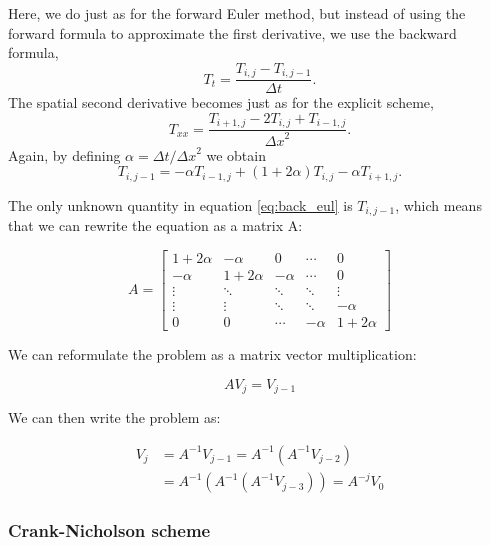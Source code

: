 \documentclass{article}
\begin{document}
\begin{multicols}{2}
Here, we do just as for the forward Euler method, but instead of using the forward formula to approximate the first derivative, we use the backward formula,
\begin{equation}
T_t=\frac{T_{i,j}-T_{i,j-1}}{\Delta t}.
\end{equation}
The spatial second derivative becomes just as for the explicit scheme, 
\begin{equation}
T_{xx}=\frac{T_{i+1,j}-2T_{i,j}+ T_{i-1,j}}{{\Delta x}^2}.
\end{equation}
Again, by defining $\alpha = \Delta t/ {\Delta x}^2$ we obtain
\begin{equation}
T_{i,j-1}=-\alpha T_{i-1,j}+(1+2\alpha )T_{i,j} - \alpha T_{i+1, j}. \label{eq:back_eul}
\end{equation}

The only unknown quantity in equation \ref{eq:back_eul} is $T_{i,j-1}$, which means that we can rewrite the equation as a matrix A:

\begin{equation}
A = 
\begin{bmatrix}
1+2\alpha & -\alpha & 0 & \cdots & 0 \\
-\alpha & 1+2\alpha & -\alpha & \cdots & 0  \\
\vdots  & \ddots  & \ddots & \ddots & \vdots  \\
\vdots  & \vdots  & \ddots & \ddots & -\alpha  \\
0 & 0 & \cdots & -\alpha & 1+2\alpha
\end{bmatrix}
\end{equation}

We can reformulate the problem as a matrix vector multiplication:

\begin{equation}
A V_j=V_{j-1}
\end{equation}

We can then write the problem as:

\begin{equation}
\begin{split}
V_j &= A^{-1}V_{j-1}=A^{-1}(A^{-1}V_{j-2})\\
&=A^{-1}(A^{-1}(A^{-1}V_{j-3}))=A^{-j}V_0
\end{split}
\end{equation}

\subsubsection{Crank-Nicholson scheme}


\end{multicols}
\end{document}
